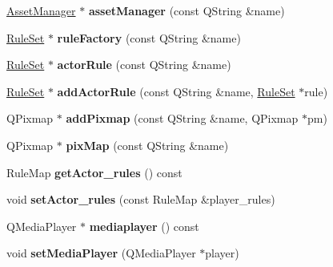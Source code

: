 \begin{DoxyCompactItemize}
\mbox{\label{classmfg_1_1_engine_a2add7951cfef6093f77d07c7780d4def}} 
\hyperlink{class_asset_manager}{Asset\+Manager} $\ast$ {\bfseries asset\+Manager} (const Q\+String \&name)
\item 
\mbox{\label{classmfg_1_1_engine_a57372977f9e802e67a9f7bce0cd983e7}} 
\hyperlink{class_rule_set}{Rule\+Set} $\ast$ {\bfseries rule\+Factory} (const Q\+String \&name)
\item 
\mbox{\label{classmfg_1_1_engine_a3bd604d0698f7e72c38051cdeaff10d2}} 
\hyperlink{class_rule_set}{Rule\+Set} $\ast$ {\bfseries actor\+Rule} (const Q\+String \&name)
\item 
\mbox{\label{classmfg_1_1_engine_a3a06b7886658de0da68ca942a0b837b0}} 
\hyperlink{class_rule_set}{Rule\+Set} $\ast$ {\bfseries add\+Actor\+Rule} (const Q\+String \&name, \hyperlink{class_rule_set}{Rule\+Set} $\ast$rule)
\item 
\mbox{\label{classmfg_1_1_engine_a2467edce40ee2d41b688d047df2396b0}} 
Q\+Pixmap $\ast$ {\bfseries add\+Pixmap} (const Q\+String \&name, Q\+Pixmap $\ast$pm)
\item 
\mbox{\label{classmfg_1_1_engine_ad212205e8b53041f1284013ff4a7eacb}} 
Q\+Pixmap $\ast$ {\bfseries pix\+Map} (const Q\+String \&name)
\item 
\mbox{\label{classmfg_1_1_engine_a6ef9267c4fc390f42ae27baef1c6f701}} 
Rule\+Map {\bfseries get\+Actor\+\_\+rules} () const
\item 
\mbox{\label{classmfg_1_1_engine_aacf5e27746b15291536e0573cfc4e415}} 
void {\bfseries set\+Actor\+\_\+rules} (const Rule\+Map \&player\+\_\+rules)
\item 
\mbox{\label{classmfg_1_1_engine_af4126c00eb8ac07bd8bc56f67f4b0890}} 
Q\+Media\+Player $\ast$ {\bfseries mediaplayer} () const
\item 
\mbox{\label{classmfg_1_1_engine_ae9401d26bc77d69553e9d4d58bc7ce22}} 
void {\bfseries set\+Media\+Player} (Q\+Media\+Player $\ast$player)

\end{DoxyCompactItemize}
